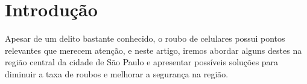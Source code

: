 \section{Introdução}

    Apesar de um delito bastante conhecido, o roubo de celulares possui pontos
    relevantes que merecem atenção, e neste artigo, iremos abordar alguns destes
    na região central da cidade de São Paulo e apresentar possíveis soluções
    para diminuir a taxa de roubos e melhorar a segurança na região.